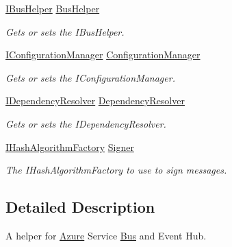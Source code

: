 \begin{DoxyCompactItemize}
\hyperlink{interfaceCqrs_1_1Bus_1_1IBusHelper}{I\+Bus\+Helper} \hyperlink{classCqrs_1_1Azure_1_1ServiceBus_1_1AzureBusHelper_a1a827b64ae73d8c368852e77dc94a2b1_a1a827b64ae73d8c368852e77dc94a2b1}{Bus\+Helper}
\begin{DoxyCompactList}\small\item\em Gets or sets the I\+Bus\+Helper. \end{DoxyCompactList}\item 
\hyperlink{interfaceCqrs_1_1Configuration_1_1IConfigurationManager}{I\+Configuration\+Manager} \hyperlink{classCqrs_1_1Azure_1_1ServiceBus_1_1AzureBusHelper_aae005b5dd2d891bfe8e959c6360ff5a4_aae005b5dd2d891bfe8e959c6360ff5a4}{Configuration\+Manager}
\begin{DoxyCompactList}\small\item\em Gets or sets the I\+Configuration\+Manager. \end{DoxyCompactList}\item 
\hyperlink{interfaceCqrs_1_1Configuration_1_1IDependencyResolver}{I\+Dependency\+Resolver} \hyperlink{classCqrs_1_1Azure_1_1ServiceBus_1_1AzureBusHelper_a39d23fe045229940190c71577a49b715_a39d23fe045229940190c71577a49b715}{Dependency\+Resolver}
\begin{DoxyCompactList}\small\item\em Gets or sets the I\+Dependency\+Resolver. \end{DoxyCompactList}\item 
\hyperlink{interfaceCqrs_1_1Bus_1_1IHashAlgorithmFactory}{I\+Hash\+Algorithm\+Factory} \hyperlink{classCqrs_1_1Azure_1_1ServiceBus_1_1AzureBusHelper_ab7901a2e7cdeb4010126506a6c301d00_ab7901a2e7cdeb4010126506a6c301d00}{Signer}
\begin{DoxyCompactList}\small\item\em The I\+Hash\+Algorithm\+Factory to use to sign messages. \end{DoxyCompactList}\end{DoxyCompactItemize}


\subsection{Detailed Description}
A helper for \hyperlink{namespaceCqrs_1_1Azure}{Azure} Service \hyperlink{namespaceCqrs_1_1Bus}{Bus} and Event Hub. 


